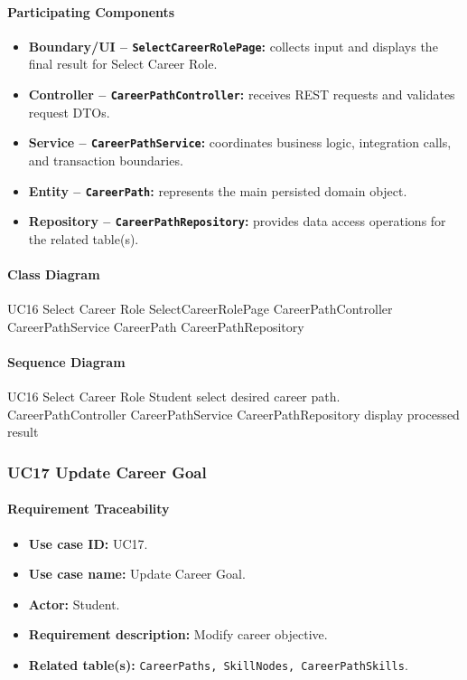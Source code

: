 \paragraph{Participating Components}

\begin{itemize}
    \item \textbf{Boundary/UI -- \texttt{SelectCareerRolePage}:} collects input and displays the final result for Select Career Role.
    \item \textbf{Controller -- \texttt{CareerPathController}:} receives REST requests and validates request DTOs.
    \item \textbf{Service -- \texttt{CareerPathService}:} coordinates business logic, integration calls, and transaction boundaries.
    \item \textbf{Entity -- \texttt{CareerPath}:} represents the main persisted domain object.
    \item \textbf{Repository -- \texttt{CareerPathRepository}:} provides data access operations for the related table(s).
\end{itemize}

\paragraph{Class Diagram}

\ClassDiagram
{UC16 Select Career Role}
{SelectCareerRolePage}
{CareerPathController}
{CareerPathService}
{CareerPath}
{CareerPathRepository}

\paragraph{Sequence Diagram}

\SequenceDiagram
{UC16 Select Career Role}
{Student}
{select desired career path.}
{CareerPathController}
{CareerPathService}
{CareerPathRepository}
{display processed result}

\subsubsection{UC17 Update Career Goal}

\paragraph{Requirement Traceability}

\begin{itemize}
    \item \textbf{Use case ID:} UC17.
    \item \textbf{Use case name:} Update Career Goal.
    \item \textbf{Actor:} Student.
    \item \textbf{Requirement description:} Modify career objective.
    \item \textbf{Related table(s):} \texttt{CareerPaths, SkillNodes, CareerPathSkills}.
\end{itemize}


